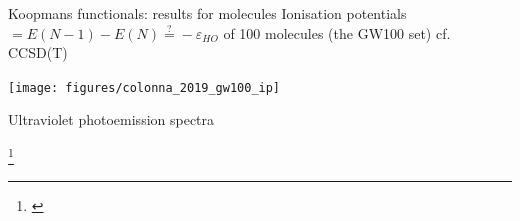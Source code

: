 \documentclass[xcolor=table,aspectratio=169]{beamer}
\newcommand\blfootcite[1]{%
  \begingroup
  \renewcommand\thefootnote{}\footnote{\hspace{-4ex}\cite{#1}}%
  \addtocounter{footnote}{-1}%
  \endgroup
}
\numberwithin{equation}{section}
\begin{document}
\begin{frame}{Koopmans functionals: results for molecules}
   \small
   Ionisation potentials $ = E(N-1) - E(N) \stackrel{?}{=} -\varepsilon_{HO}$ of 100 molecules (the GW100 set) cf. CCSD(T)
   \begin{center}
      \texttt{[image: figures/colonna\_2019\_gw100\_ip]}
   \end{center}

   \vspace{-3ex}
   Ultraviolet photoemission spectra
   \begin{center}
   \end{center}
   \vspace{-2ex}

   \blfootcite{Colonna2018,Nguyen2015}
\end{frame}

% 
% 
% 
\end{document}
